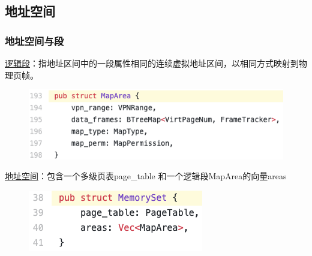 \subsection{地址空间}
\begin{frame}
    \frametitle{地址空间与段}
% 
\href{https://rcore-os.github.io/rCore-Tutorial-Book-v3/chapter4/5kernel-app-spaces.html\#id4}{逻辑段}：指地址区间中的一段属性相同的连续虚拟地址区间，以相同方式映射到物理页帧。
% 
    \begin{figure}
        \centering
        \includegraphics[width=0.6\linewidth]{figs/memory_set-L193.png}
    \end{figure}
% 
% 
\href{https://rcore-os.github.io/rCore-Tutorial-Book-v3/chapter4/5kernel-app-spaces.html\#id5}{地址空间}：包含一个多级页表page\_table 和一个逻辑段MapArea的向量areas
% 
    \begin{figure}
        \centering
        \includegraphics[width=0.4\linewidth]{figs/memory_set-L38.png}
    \end{figure}
% 
% 
% 
\end{frame}
